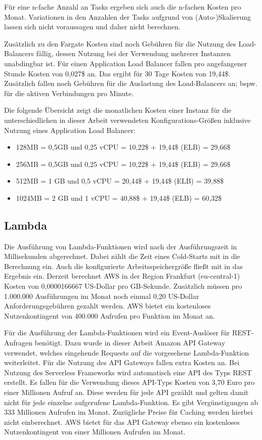 Für eine n-fache Anzahl an Tasks ergeben sich auch die n-fachen Kosten pro Monat. Variationen in den Anzahlen der Tasks aufgrund von (Auto-)Skalierung lassen sich nicht voraussagen und daher nicht berechnen.

Zusätzlich zu den Fargate Kosten sind noch Gebühren für die Nutzung des Load-Balancers fällig, dessen Nutzung bei der Verwendung mehrerer Instanzen unabdingbar ist. Für einen Application Load Balancer fallen pro angefangener Stunde Kosten von 0,027\$ an. Das ergibt für 30 Tage Kosten von 19,44\$. Zusätzlich fallen noch Gebühren für die Auslastung des Load-Balancers an; bspw. für die aktiven Verbindungen pro Minute\cite{noauthor_preise_nodate}.

Die folgende Übersicht zeigt die monatlichen Kosten einer Instanz für die unterschiedlichen in dieser Arbeit verwendeten Konfigurations-Größen inklusive Nutzung eines Application Load Balancer:

\begin{itemize}
    \item 128MB = 0,5GB und 0,25 vCPU = 10,22\$ + 19,44\$ (ELB) = 29,66\$
    \item 256MB = 0,5GB und 0,25 vCPU = 10,22\$ + 19,44\$ (ELB) = 29,66\$
    \item 512MB = 1  GB und 0,5  vCPU = 20,44\$ + 19,44\$ (ELB) = 39,88\$
    \item 1024MB = 2 GB und 1    vCPU = 40,88\$ + 19,44\$ (ELB) = 60,32\$
\end{itemize}


\subsection{Lambda}
\label{subsec:kosten-lambda}
Die Ausführung von Lambda-Funktionen wird nach der Ausführungszeit in Millisekunden abgerechnet. Dabei zählt die Zeit eines Cold-Starts mit in die Berechnung ein. Auch die konfigurierte Arbeitsspeichergröße fließt mit in das Ergebnis ein. Derzeit berechnet AWS in der Region Frankfurt (eu-central-1) Kosten von 0,0000166667 US-Dollar pro GB-Sekunde\cite{noauthor_lambda_nodate}. Zusätzlich müssen pro 1.000.000 Ausführungen im Monat noch einmal 0,20 US-Dollar Anforderungsgebühren gezahlt werden. AWS bietet ein kostenloses Nutzenkontingent von 400.000 Aufrufen pro Funktion im Monat an.

Für die Ausführung der Lambda-Funktionen wird ein Event-Auslöser für REST-Anfragen benötigt. Dazu wurde in dieser Arbeit Amazon API Gateway verwendet, welches eingehende Requests auf die vorgesehene Lambda-Funktion weiterleitet. Für die Nutzung des API Gateways fallen extra Kosten an. Bei Nutzung des Serverless Frameworks wird automatisch eine API des Typs REST erstellt. Es fallen für die Verwendung dieses API-Typs Kosten von 3,70 Euro pro einer Millionen Aufruf an. Diese werden für jede API gezählt und gelten damit nicht für jede einzelne aufgerufene Lambda-Funktion. Es gibt Vergünstigungen ab 333 Millionen Aufrufen im Monat. Zuzügliche Preise für Caching werden hierbei nicht einberechnet. AWS bietet für das API Gateway ebenso ein kostenloses Nutzenkontingent von einer Millionen Aufrufen im Monat\cite{noauthor_amazon_nodate}.

